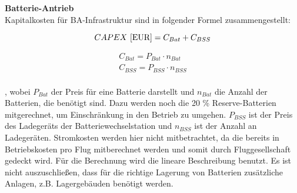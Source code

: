 \textbf{Batterie-Antrieb}\\
Kapitalkosten für BA-Infrastruktur sind in folgender Formel zusammengestellt:

\begin{equation}
     {CAPEX ~[\text{EUR}]} = C_{Bat} + C_{BSS} \\ %
     \label{BA_Infrastruktur}
  \end{equation}

\begin{equation}
   \begin{split}
  {C_{Bat}} = P_{Bat} \cdot n_{Bat}  \\
  {C_{BSS}} = P_{BSS} \cdot n_{BSS} \\
  \label{BA}
   \end{split}
  \end{equation}

, wobei $P_{Bat}$ der Preis für eine Batterie darstellt und $n_{Bat}$ die Anzahl der Batterien, die benötigt sind. 
Dazu werden noch die 20 \% Reserve-Batterien mitgerechnet, um Einschränkung in den Betrieb zu umgehen. 
$P_{BSS}$ ist der Preis des Ladegeräts der Batteriewechselstation und $n_{BSS}$ ist der Anzahl an Ladegeräten. %
Stromkosten werden hier nicht mitbetrachtet, da die bereits in Betriebskosten pro Flug mitberechnet werden und somit durch Fluggesellschaft
gedeckt wird. %
Für die Berechnung wird die lineare Beschreibung benutzt. Es ist nicht auszuschließen, dass für die richtige Lagerung von Batterien
zusätzliche Anlagen, z.B. Lagergebäuden benötigt werden. 
  
